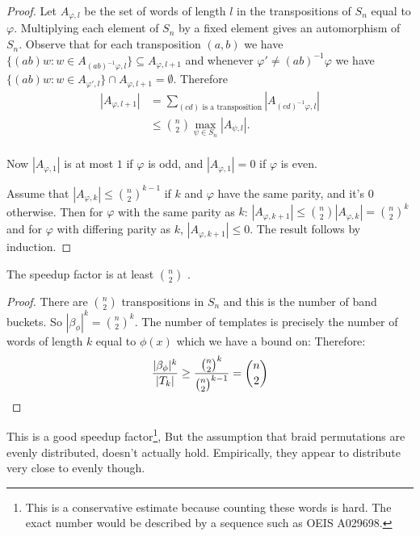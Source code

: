 \documentclass[12pt]{thesis}
\begin{document}
\begin{proof}
    Let $A_{\varphi, l}$ be the set of words of length $l$ in the transpositions of $S_{n}$
    equal to $\varphi$.
    Multiplying each element of $S_{n}$ by a fixed element 
    gives an automorphism of $S_{n}$.
    Observe that for each transposition $(a, b)$
    we have $\{ (ab) w \colon w \in A_{(ab)^{-1} \varphi, l} \} \subseteq A_{\varphi, l+1 }$
    and whenever $\varphi' \neq (ab)^{-1}\varphi$ we have $\{ (ab) w \colon w \in A_{\varphi', l} \} \cap A_{\varphi, l+1} = \emptyset$.
    Therefore
    \[
    \begin{split}
        |A_{\varphi, l+1}| &= \sum_{(cd) \text{ is a transposition}} |A_{(cd)^{-1}\varphi, l}| \\
                              &\leq { n \choose 2 }  \max_{\psi \in S_{n}} |A_{\psi, l}|. \\
    \end{split}
    \]

    Now $|A_{\varphi, 1}|$ is at most $1$ if $\varphi$ is odd,
    and $|A_{\varphi, 1}| = 0$ if $\varphi$ is even. 

    Assume that $|A_{\varphi, k}| \leq { n \choose 2}^{k -1}$
    if $k$ and $\varphi$ have the same parity,
    and it's 0 otherwise.
    Then for $\varphi$ with the same parity as $k$: $|A_{\varphi, k +1}| \leq { n \choose 2} |A_{\varphi, k}| = {n \choose 2}^{k}$
    and for $\varphi$ with differing parity as $k$, $|A_{\varphi, k + 1}| \leq 0$.
    The result follows by induction.
\end{proof}

\begin{theorem}
    The speedup factor is at least ${ n \choose 2 }$ .
\end{theorem}

\begin{proof}
    There are ${ n \choose 2 }$ transpositions in $S_{n}$ and this is the number
    of band buckets.
    So $|\beta_{\phi}|^{k} = {n \choose 2}^{k}$.
    The number of templates is precisely the number of words of length $k$ equal to $\phi(x)$
    which we have a bound on:
    Therefore:
    \[
        \frac{|\beta_{\phi}|^{k}}{|T_{k}|} \geq \frac{ {n \choose 2}^{k} }{ {n \choose 2}^{k-1} } = {n \choose 2}
        \qedhere
    \]
\end{proof}

This is a good speedup factor\footnote{This is a conservative estimate because counting these words is hard.
              The exact number would be described by a sequence such as OEIS A029698\cite{oeis}.},
But the assumption that braid permutations are evenly distributed,
doesn't actually hold. Empirically, they appear to distribute very close to evenly though.
\end{document}
